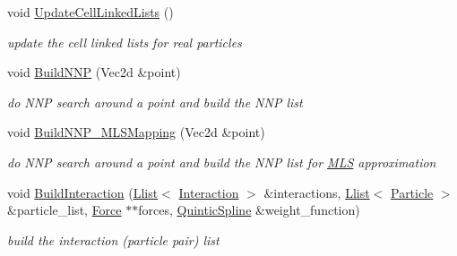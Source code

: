 \begin{CompactItemize}
\item 
void \hyperlink{classParticleManager_740244439672f753735abc5a6a7cc3bc}{UpdateCellLinkedLists} ()
\begin{CompactList}\small\item\em update the cell linked lists for real particles \item\end{CompactList}\item 
void \hyperlink{classParticleManager_4e0f9e5cb222739a83f0f80ee4ba265b}{BuildNNP} (Vec2d \&point)
\begin{CompactList}\small\item\em do NNP search around a point and build the NNP list \item\end{CompactList}\item 
void \hyperlink{classParticleManager_b68ab55a9429ac8d32368b531487dcec}{BuildNNP\_\-MLSMapping} (Vec2d \&point)
\begin{CompactList}\small\item\em do NNP search around a point and build the NNP list for \hyperlink{classMLS}{MLS} approximation \item\end{CompactList}\item 
void \hyperlink{classParticleManager_8cc6658324694ad28d3c50bfc0cbd0f7}{BuildInteraction} (\hyperlink{classLlist}{Llist}$<$ \hyperlink{classInteraction}{Interaction} $>$ \&interactions, \hyperlink{classLlist}{Llist}$<$ \hyperlink{classParticle}{Particle} $>$ \&particle\_\-list, \hyperlink{classForce}{Force} $\ast$$\ast$forces, \hyperlink{classQuinticSpline}{QuinticSpline} \&weight\_\-function)
\begin{CompactList}\small\item\em build the interaction (particle pair) list \item\end{CompactList}\end{CompactItemize}
